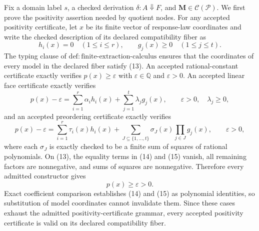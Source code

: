 Fix a domain label \(s\), a checked derivation \(\delta:A\Downarrow F\), and \(\mathbf M\in\mathcal C(\mathcal P)\). We first prove the positivity assertion needed by quotient nodes. For any accepted positivity certificate, let \(x\) be its finite vector of response-law coordinates and write the checked description of its declared compatibility fiber as
\[
 h_i(x)=0\quad(1\le i\le r),
 \qquad
 g_j(x)\ge 0\quad(1\le j\le t).
\tag{13}
\]
The typing clause of \(\mathrm{def:finite\text{-}extraction\text{-}calculus}\) ensures that the coordinates of every model in the declared fiber satisfy (13). An accepted rational-constant certificate exactly verifies \(p(x)\ge\varepsilon\) with \(\varepsilon\in\mathbb Q\) and \(\varepsilon>0\). An accepted linear face certificate exactly verifies
\[
 p(x)-\varepsilon
 =\sum_{i=1}^{r}\alpha_i h_i(x)
  +\sum_{j=1}^{t}\lambda_j g_j(x),
 \qquad \varepsilon>0,\quad\lambda_j\ge 0,
\tag{14}
\]
and an accepted preordering certificate exactly verifies
\[
 p(x)-\varepsilon
 =\sum_{i=1}^{r}\tau_i(x)h_i(x)
  +\sum_{J\subseteq\{1,\ldots,t\}}
    \sigma_J(x)\prod_{j\in J}g_j(x),
 \qquad \varepsilon>0,
\tag{15}
\]
where each \(\sigma_J\) is exactly checked to be a finite sum of squares of rational polynomials. On (13), the equality terms in (14) and (15) vanish, all remaining factors are nonnegative, and sums of squares are nonnegative. Therefore every admitted constructor gives
\[
 p(x)\ge\varepsilon>0.
\tag{16}
\]
Exact coefficient comparison establishes (14) and (15) as polynomial identities, so substitution of model coordinates cannot invalidate them. Since these cases exhaust the admitted positivity-certificate grammar, every accepted positivity certificate is valid on its declared compatibility fiber.

